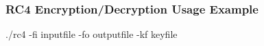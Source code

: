 \subsubsection*{R\+C4 Encryption/\+Decryption Usage Example}


\begin{DoxyCode}
./rc4 -fi inputfile -fo outputfile -kf keyfile
\end{DoxyCode}




 
